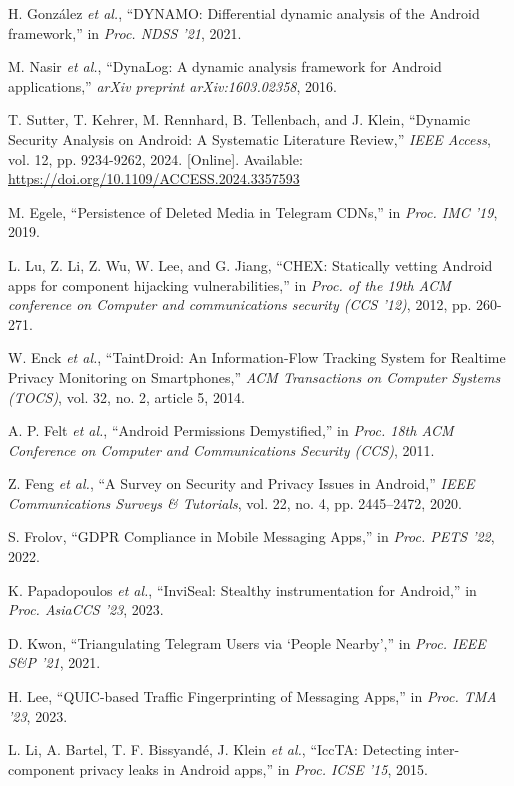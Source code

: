 \documentclass[a4paper,12pt]{report}
\begin{document}
\begin{thebibliography}{99}
H. González \emph{et al.}, “DYNAMO: Differential dynamic analysis of the Android framework,” in \emph{Proc. NDSS '21}, 2021.

M. Nasir \emph{et al.}, “DynaLog: A dynamic analysis framework for Android applications,” \emph{arXiv preprint arXiv:1603.02358}, 2016.

T. Sutter, T. Kehrer, M. Rennhard, B. Tellenbach, and J. Klein, “Dynamic Security Analysis on Android: A Systematic Literature Review,” \emph{IEEE Access}, vol. 12, pp. 9234-9262, 2024. [Online]. Available: \url{https://doi.org/10.1109/ACCESS.2024.3357593}

M. Egele, “Persistence of Deleted Media in Telegram CDNs,” in \emph{Proc. IMC '19}, 2019.

L. Lu, Z. Li, Z. Wu, W. Lee, and G. Jiang, “CHEX: Statically vetting Android apps for component hijacking vulnerabilities,” in \emph{Proc. of the 19th ACM conference on Computer and communications security (CCS '12)}, 2012, pp. 260-271.

W. Enck \emph{et al.}, “TaintDroid: An Information-Flow Tracking System for Realtime Privacy Monitoring on Smartphones,” \emph{ACM Transactions on Computer Systems (TOCS)}, vol. 32, no. 2, article 5, 2014.

A. P. Felt \emph{et al.}, “Android Permissions Demystified,” in \emph{Proc. 18th ACM Conference on Computer and Communications Security (CCS)}, 2011.

Z. Feng \emph{et al.}, “A Survey on Security and Privacy Issues in Android,” \emph{IEEE Communications Surveys \& Tutorials}, vol. 22, no. 4, pp. 2445–2472, 2020.

S. Frolov, “GDPR Compliance in Mobile Messaging Apps,” in \emph{Proc. PETS '22}, 2022.

K. Papadopoulos \emph{et al.}, “InviSeal: Stealthy instrumentation for Android,” in \emph{Proc. AsiaCCS '23}, 2023.

D. Kwon, “Triangulating Telegram Users via ‘People Nearby’,” in \emph{Proc. IEEE S\&P '21}, 2021.

H. Lee, “QUIC-based Traffic Fingerprinting of Messaging Apps,” in \emph{Proc. TMA '23}, 2023.

L. Li, A. Bartel, T. F. Bissyandé, J. Klein \emph{et al.}, “IccTA: Detecting inter-component privacy leaks in Android apps,” in \emph{Proc. ICSE ’15}, 2015.


\end{thebibliography}
\end{document}
